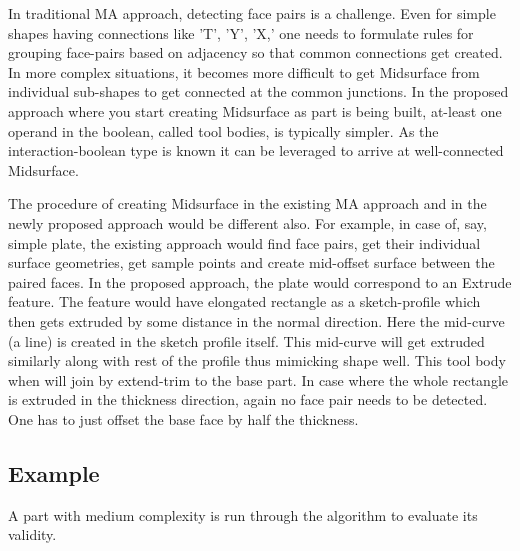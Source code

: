 In traditional MA approach, detecting face pairs is a challenge. Even for simple shapes having connections like ’T’, 'Y', ’X,’ one needs to formulate rules for grouping face-pairs based on adjacency so that common connections get created. In more complex situations, it becomes more difficult to get Midsurface from individual sub-shapes to get connected at the common junctions. In the proposed approach where you start creating Midsurface as part is being built, at-least one operand in the boolean, called tool bodies, is typically simpler. As the interaction-boolean type is known it can be leveraged to arrive at well-connected Midsurface. 

The procedure of creating Midsurface in the existing MA approach and in the newly proposed approach would be different also. For example, in case of, say, simple plate, the existing approach would find face pairs, get their individual surface geometries, get sample points and create mid-offset surface between the paired faces. In the proposed approach, the plate would correspond to an Extrude feature. The feature would have elongated rectangle as a sketch-profile which then gets extruded by some distance in the normal direction. Here the mid-curve (a line) is created in the sketch profile itself. This mid-curve will get extruded similarly along with rest of the profile thus mimicking shape well. This tool body when will join by extend-trim to the base part. In case where the whole rectangle is extruded in the thickness direction, again no face pair needs to be detected. One has to just offset the base face by half the thickness.


\subsection{Example}

A part with medium complexity is run through the algorithm to evaluate its validity.



